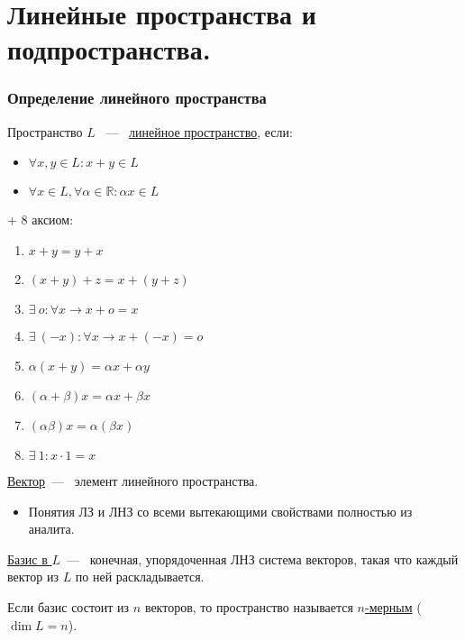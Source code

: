 \part{Линейные пространства и подпространства.}
\section{Определение линейного пространства}
\begin{definition} %
	Пространство $L$ ~---~ \underline{линейное пространство}, если:
	\begin{itemize}
		\item $\forall x, y \in L: x + y \in L$
		\item $\forall x \in L, \forall \alpha \in \mathbb{R} : \alpha x \in L$
	\end{itemize}
	
	+ 8 аксиом:
	\begin{enumerate}
		\item $x + y = y+x$
		\item $(x+y) +z=x +(y+z)$
		\item $\exists\ o : \forall x \rightarrow x+o=x$
		\item $\exists\ (-x):\forall x \rightarrow  x+(-x) = o$
		\item $\alpha(x+y) = \alpha x+\alpha y$
		\item $(\alpha +\beta)x = \alpha x+\beta x$
		\item $(\alpha\beta) x=\alpha(\beta x)$
		\item $\exists\ 1: x\cdot 1= x$
	\end{enumerate}
\end{definition} 
\underline{Вектор}~---~ элемент линейного пространства.

\begin{itemize}
	\item Понятия ЛЗ и ЛНЗ со всеми вытекающими свойствами полностью из аналита.
\end{itemize}

\begin{definition}
	\underline{Базис в $L$}~---~ конечная, упорядоченная ЛНЗ система векторов, такая что каждый вектор из $L$ по ней раскладывается.
\end{definition}
Если базис состоит из $n$ векторов, то пространство называется \underline{$n$-мерным} ($\dim L = n$). %
\vspace{3mm}

